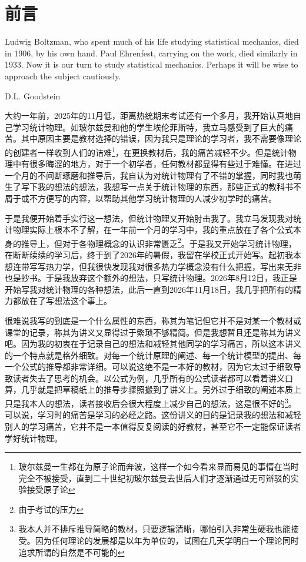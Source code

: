 \documentclass[../../main.tex]{subfiles}
\begin{document}
\chapter*{前言}
\setlength{\epigraphwidth}{0.8\textwidth}
\epigraph{Ludwig Boltzman, who spent much of his life studying statistical mechanics, died in 1906, by his own hand. Paul Ehrenfest, carrying on the work, died similarly in 1933. Now it is our turn to study statistical mechanics. Perhaps it will be wise to approach the subject cautiously.}{D.L. Goodstein}
\vspace{1.5em}

大约一年前，2025年的11月低，距离热统期末考试还有一个多月，我开始认真地自己学习统计物理。如玻尔兹曼和他的学生埃伦菲斯特，我立马感受到了巨大的痛苦。其中原因主要是教材选择的错误，因为我只是理论的学习者，我不需要像理论的创建者一样收到人们的诘难\footnote{玻尔兹曼一生都在为原子论而奔波，这样一个如今看来显而易见的事情在当时完全不被接受，直到二十世纪初玻尔兹曼去世后人们才逐渐通过无可辩驳的实验接受原子论}，在更换教材后，我的痛苦减轻不少。但是统计物理中有很多晦涩的地方，对于一个初学者，任何教材都显得有些过于难懂。在进过一个月的不间断琢磨和推导后，我自认为对统计物理有了不错的掌握，同时我也萌生了写下我的想法的想法，我想写一点关于统计物理的东西，那些正式的教科书不屑于或不方便写的内容，以帮助其他学习统计物理的人减少初学时的痛苦。

于是我便开始着手实行这一想法，但统计物理又开始肘击我了。我立马发现我对统计物理实际上根本不了解，在一年前一个月的学习中，我的重点放在了各个公式本身的推导上，但对于各物理概念的认识非常匮乏\footnote{由于考试的压力}。于是我又开始学习统计物理，在断断续续的学习后，终于到了2026年的暑假，我留在学校正式开始写。起初我本想连带写写热力学，但我很快发现我对很多热力学概念没有什么把握，写出来无非也是抄书。于是我放弃这个额外的想法，只写统计物理。2026年8月12日，我正是开始写我对统计物理的各种想法，此后一直到2026年11月18日，我几乎把所有的精力都放在了写想法这个事上。

很难说我写的到底是一个什么属性的东西，称其为笔记但它并不是对某一个教材或课堂的记录，称其为讲义又显得过于繁琐不够精简。但是我想暂且还是称其为讲义吧。因为我的初衷在于记录自己的想法和减轻其他同学的学习痛苦，所以这本讲义的一个特点就是格外细致。对每一个统计原理的阐述、每一个统计模型的提出、每一个公式的推导都非常详细。可以说这绝不是一本好的教材，因为它太过于细致导致读者失去了思考的机会。以公式为例，几乎所有的公式读者都可以看着讲义口算，几乎就是把草稿纸上的推导步骤照搬到了讲义上。另外过于细致的阐述本质上只是我本人的想法，读者接收后会很大程度上减少自己的想法，这是很不好的\footnote{我本人并不排斥推导简略的教材，只要逻辑清晰，哪怕引入非常生硬我也能接受。因为任何理论的发展都是以年为单位的，试图在几天学明白一个理论同时追求所谓的自然是不可能的}。可以说，学习时的痛苦是学习的必经之路。这份讲义的目的是记录我的想法和减轻别人的学习痛苦，它并不是一本值得反复阅读的好教材，甚至它不一定能保证读者学好统计物理。
\end{document}

